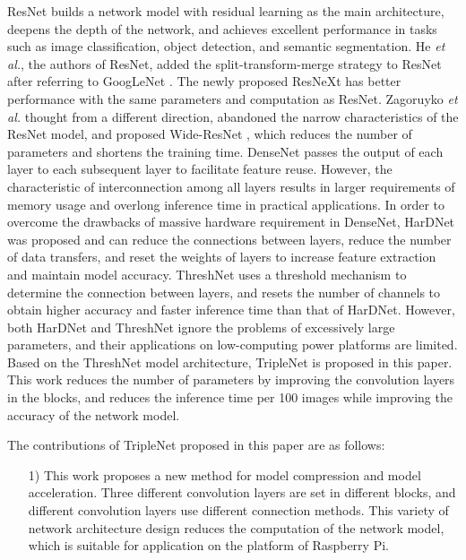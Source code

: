 \documentclass[default,iicol]{sn-jnl}
\theoremstyle{thmstyleone}\newtheorem{theorem}{Theorem}\newtheorem{proposition}[theorem]{Proposition}
\theoremstyle{thmstyletwo}\newtheorem{example}{Example}\newtheorem{remark}{Remark}
\theoremstyle{thmstylethree}\newtheorem{definition}{Definition}
\begin{document}
ResNet \cite{he2016deep} builds a network model with residual learning as the main architecture, deepens the depth of the network, and achieves excellent performance in tasks such as image classification, object detection, and semantic segmentation. He \emph{et al.}, the authors of ResNet, added the split-transform-merge strategy to ResNet after referring to GoogLeNet \cite{szegedy2015going}. The newly proposed ResNeXt \cite{xie2017aggregated} has better performance with the same parameters and computation as ResNet. Zagoruyko \emph{et al.} thought from a different direction, abandoned the narrow characteristics of the ResNet model, and proposed Wide-ResNet \cite{zagoruyko2016wide}, which reduces the number of parameters and shortens the training time. DenseNet \cite{huang2017densely} passes the output of each layer to each subsequent layer to facilitate feature reuse. However, the characteristic of interconnection among all layers results in larger requirements of memory usage and overlong inference time in practical applications. In order to overcome the drawbacks of massive hardware requirement in DenseNet, HarDNet \cite{chao2019hardnet} was proposed and can reduce the connections between layers, reduce the number of data transfers, and reset the weights of layers to increase feature extraction and maintain model accuracy. ThreshNet \cite{ju2022threshnet} uses a threshold mechanism to determine the connection between layers, and resets the number of channels to obtain higher accuracy and faster inference time than that of HarDNet. However, both HarDNet and ThreshNet ignore the problems of excessively large parameters, and their applications on low-computing power platforms are limited. Based on the ThreshNet model architecture, TripleNet is proposed in this paper. This work reduces the number of parameters by improving the convolution layers in the blocks, and reduces the inference time per 100 images while improving the accuracy of the network model.

The contributions of TripleNet proposed in this paper are as follows:

\begin{itemize}
    \item [1)]
    This work proposes a new method for model compression and model acceleration. Three different convolution layers are set in different blocks, and different convolution layers use different connection methods. This variety of network architecture design reduces the computation of the network model, which is suitable for application on the platform of Raspberry Pi.
\end{itemize}
\end{document}
